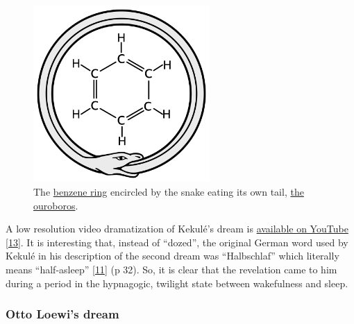 \documentclass[
  a4paper,
]{article}
\begin{document}
\begin{figure}
\hypertarget{fig:benzene}{%
\centering
\includegraphics[width=0.6\textwidth,height=\textheight]{images/ouroboros-benzene.svg}
\caption[The
\href{https://en.wikipedia.org/wiki/Benzene\#Structure}{benzene ring}
encircled by the snake eating its own tail,
\href{https://en.wikipedia.org/wiki/Ouroboros}{the ouroboros}.]{The
\href{https://en.wikipedia.org/wiki/Benzene\#Structure}{benzene ring}
encircled by the snake eating its own tail,
\href{https://en.wikipedia.org/wiki/Ouroboros}{the
ouroboros}.\footnotemark{}}\label{fig:benzene}
}
\end{figure}

A low resolution video dramatization of Kekulé's dream is
\href{https://www.youtube.com/watch?v=2NRwd-JJFm4}{available on YouTube}
\protect\hyperlink{ref-kekules-dream}{{[}13{]}}. It is interesting that,
instead of ``dozed'', the original German word used by Kekulé in his
description of the second dream was ``Halbschlaf'' which literally means
``half-asleep'' \protect\hyperlink{ref-weisberg86}{{[}11{]}} (p 32). So,
it is clear that the revelation came to him during a period in the
hypnagogic, twilight state between wakefulness and sleep.

\hypertarget{otto-loewis-dream}{%
\subsubsection{Otto Loewi's dream}\label{otto-loewis-dream}}
\end{document}
